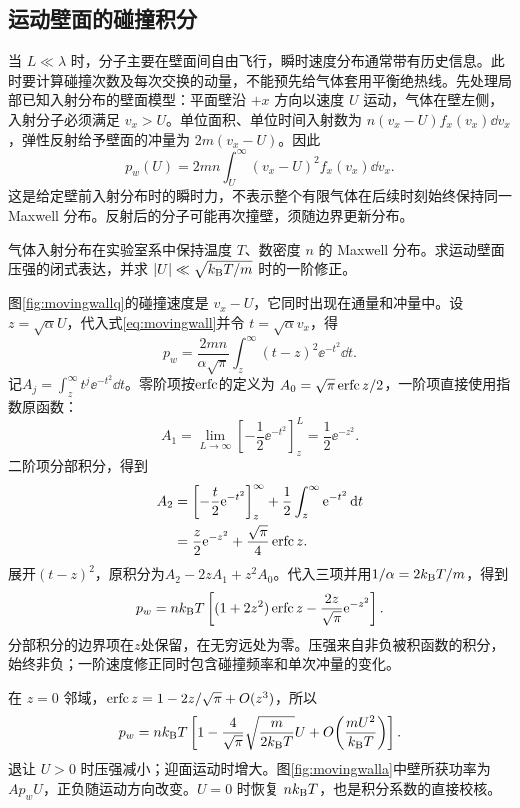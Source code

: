 \subsection{运动壁面的碰撞积分}
\label{th:movingwall}
当 $L\ll\lambda$ 时，分子主要在壁面间自由飞行，瞬时速度分布通常带有历史信息。此时要计算碰撞次数及每次交换的动量，不能预先给气体套用平衡绝热线。先处理局部已知入射分布的壁面模型：平面壁沿 $+x$ 方向以速度 $U$ 运动，气体在壁左侧，入射分子必须满足 $v_x>U$。单位面积、单位时间入射数为 $n(v_x-U)f_x(v_x)\dd v_x$，弹性反射给予壁面的冲量为 $2m(v_x-U)$。因此
\begin{equation}\label{eq:movingwall}
 p_w(U)=2mn\int_U^\infty(v_x-U)^2f_x(v_x)\dd v_x.
\end{equation}
这是给定壁前入射分布时的瞬时力，不表示整个有限气体在后续时刻始终保持同一 Maxwell 分布。反射后的分子可能再次撞壁，须随边界更新分布。

\begin{example}[缓慢退让壁面的压强]\label{ex:movingwall}
气体入射分布在实验室系中保持温度 $T$、数密度 $n$ 的 Maxwell 分布。求运动壁面压强的闭式表达，并求 $|U|\ll\sqrt{k_{\mathrm B} T/m}$ 时的一阶修正。
\end{example}
\begin{solution}
图\ref{fig:movingwallq}的碰撞速度是 $v_x-U$，它同时出现在通量和冲量中。设 $z=\sqrt\alpha U$，代入式\eqref{eq:movingwall}并令 $t=\sqrt\alpha v_x$，得
\[
 p_w=\frac{2mn}{\alpha\sqrt\pi}\int_z^\infty(t-z)^2\ee^{-t^2}\dd t.
\]
记$A_j=\int_z^\infty t^j\ee^{-t^2}\dd t$。零阶项按$\operatorname{erfc}$的定义为
$A_0=\sqrt\pi\operatorname{erfc} z/2$，一阶项直接使用指数原函数：
\[
 A_1=\lim_{L\to\infty}\left[-\frac12\ee^{-t^2}\right]_z^L
 =\frac12\ee^{-z^2}.
\]
二阶项分部积分，得到
\[
 \begin{aligned}
 A_2&=\left[-\frac t2\mathrm e^{-t^2}\right]_z^\infty
 +\frac12\int_z^\infty\mathrm e^{-t^2}\mathop{}\!\mathrm d t\\
 &=\frac z2\mathrm e^{-z^2}+\frac{\sqrt\pi}4\operatorname{erfc} z.
 \end{aligned}
\]
展开$(t-z)^2$，原积分为$A_2-2zA_1+z^2A_0$。代入三项并用$1/\alpha=2k_{\mathrm B} T/m$，得到
\[
 p_w=nk_{\mathrm B} T\left[(1+2z^2)\operatorname{erfc} z-\frac{2z}{\sqrt\pi}\mathrm e^{-z^2}\right].
\]
分部积分的边界项在$z$处保留，在无穷远处为零。压强来自非负被积函数的积分，始终非负；一阶速度修正同时包含碰撞频率和单次冲量的变化。

在 $z=0$ 邻域，$\operatorname{erfc} z=1-2z/\sqrt\pi+O(z^3)$，所以
\[
 p_w=nk_{\mathrm B} T\left[1-\frac4{\sqrt\pi}\sqrt{\frac m{2k_{\mathrm B} T}}U
 +O\!\left(\frac{mU^2}{k_{\mathrm B} T}\right)\right].
\]
退让 $U>0$ 时压强减小；迎面运动时增大。图\ref{fig:movingwalla}中壁所获功率为 $Ap_wU$，正负随运动方向改变。$U=0$ 时恢复 $nk_{\mathrm B} T$，也是积分系数的直接校核。
\end{solution}

